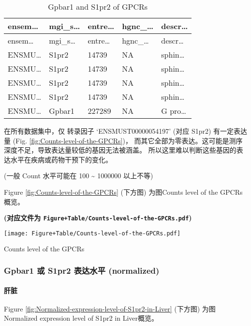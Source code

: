 \documentclass[
]{article}
\begin{document}
\begin{longtable}[]{@{}lllll@{}}
\caption{\label{tab:Gpbar1-and-S1pr2-of-GPCRs}Gpbar1 and S1pr2 of GPCRs}\tabularnewline
\toprule
ensem\ldots{} & mgi\_s\ldots{} & entre\ldots{} & hgnc\_\ldots{} & descr\ldots{}\tabularnewline
\midrule
\endfirsthead
\toprule
ensem\ldots{} & mgi\_s\ldots{} & entre\ldots{} & hgnc\_\ldots{} & descr\ldots{}\tabularnewline
\midrule
\endhead
ENSMU\ldots{} & S1pr2 & 14739 & NA & sphin\ldots{}\tabularnewline
ENSMU\ldots{} & S1pr2 & 14739 & NA & sphin\ldots{}\tabularnewline
ENSMU\ldots{} & S1pr2 & 14739 & NA & sphin\ldots{}\tabularnewline
ENSMU\ldots{} & S1pr2 & 14739 & NA & sphin\ldots{}\tabularnewline
ENSMU\ldots{} & Gpbar1 & 227289 & NA & G pro\ldots{}\tabularnewline
\bottomrule
\end{longtable}

在所有数据集中，仅 转录因子 `ENSMUST00000054197' (对应 S1pr2) 有一定表达量 (Fig. \ref{fig:Counts-level-of-the-GPCRs})，
而其它全部为零表达。这可能是测序深度不足，导致表达量较低的基因无法被涵盖。
所以这里难以判断这些基因的表达水平在疾病或药物干预下的变化。

(一般 Count 水平可能在 100 \textasciitilde{} 1000000 以上不等)

Figure \ref{fig:Counts-level-of-the-GPCRs} (下方图) 为图Counts level of the GPCRs概览。

\textbf{(对应文件为 \texttt{Figure+Table/Counts-level-of-the-GPCRs.pdf})}

\def\@captype{figure}
\begin{center}
\texttt{[image: Figure+Table/Counts-level-of-the-GPCRs.pdf]}
\caption{Counts level of the GPCRs}\label{fig:Counts-level-of-the-GPCRs}
\end{center}

\hypertarget{gpbar1-ux6216-s1pr2-ux8868ux8fbeux6c34ux5e73-normalized}{%
\subsubsection{Gpbar1 或 S1pr2 表达水平 (normalized)}\label{gpbar1-ux6216-s1pr2-ux8868ux8fbeux6c34ux5e73-normalized}}

\hypertarget{ux809dux810f}{%
\paragraph{肝脏}\label{ux809dux810f}}

Figure \ref{fig:Normalized-expression-level-of-S1pr2-in-Liver} (下方图) 为图Normalized expression level of S1pr2 in Liver概览。
\end{document}
